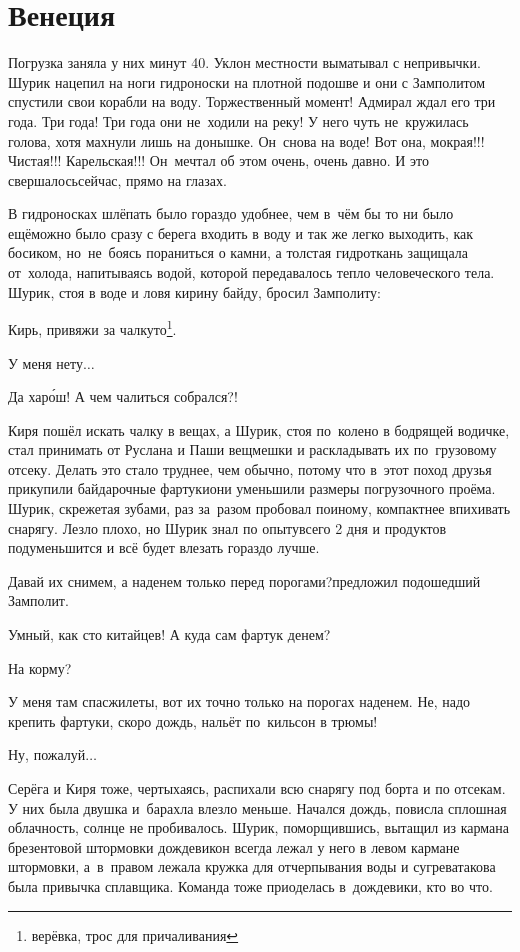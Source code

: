 \chapter{Венеция}
\vepsianrose

Погрузка заняла у них минут 40. Уклон местности выматывал с непривычки. Шурик нацепил на ноги гидроноски на плотной подошве и они с Замполитом спустили свои корабли на воду. Торжественный момент! Адмирал ждал его три года. Три года! Три года они не~ходили на реку! У него чуть не~кружилась голова, хотя махнули лишь на донышке. Он~снова на воде! Вот она, мокрая!!! Чистая!!! Карельская!!! Он~мечтал об этом очень, очень давно. И это свершалось\mdash сейчас, прямо на глазах.

В гидроносках шлёпать было гораздо удобнее, чем в~чём бы то ни было ещё\mdash можно было сразу с берега входить в воду и так же легко выходить, как босиком, но~не~боясь пораниться о камни, а толстая гидроткань защищала от~холода, напитываясь водой, которой передавалось тепло человеческого тела. Шурик, стоя в воде и ловя кирину байду, бросил Замполиту:

\diagdash Кирь, привяжи за чалку\sdash то\footnote{верёвка, трос для причаливания}.

\diagdash У меня нету$\ldots$

\diagdash Да хар\'{о}ш! А чем чалиться собрался?!

Киря пошёл искать чалку в вещах, а Шурик, стоя по~колено в бодрящей водичке, стал принимать от Руслана и Паши вещмешки и раскладывать их по~грузовому отсеку. Делать это стало труднее, чем обычно, потому что в~этот поход друзья прикупили байдарочные фартуки\mdash они уменьшили размеры погрузочного проёма. Шурик, скрежетая зубами, раз за~разом пробовал по\sdash иному, компактнее впихивать снарягу. Лезло плохо, но Шурик знал по опыту\mdash всего 2 дня и продуктов подуменьшится и всё будет влезать гораздо лучше.

\diagdash Давай их снимем, а наденем только перед порогами?\mdash предложил подошедший Замполит. 

\diagdash Умный, как сто китайцев! А куда сам фартук денем? 

\diagdash На корму?

\diagdash У меня там спасжилеты, вот их точно только на порогах наденем. Не, надо крепить фартуки, скоро дождь, нальёт по~кильсон в трюмы!

\diagdash Ну, пожалуй$\ldots$

Серёга и Киря тоже, чертыхаясь, распихали всю снарягу под борта и по отсекам. У них была двушка и~барахла влезло меньше. Начался дождь, повисла сплошная облачность, солнце не пробивалось. Шурик, поморщившись, вытащил из кармана брезентовой штормовки дождевик\mdash он всегда лежал у него в левом кармане штормовки, а~в~правом лежала кружка для отчерпывания воды и сугрева\mdash такова была привычка сплавщика. Команда тоже приоделась в~дождевики, кто во что.

